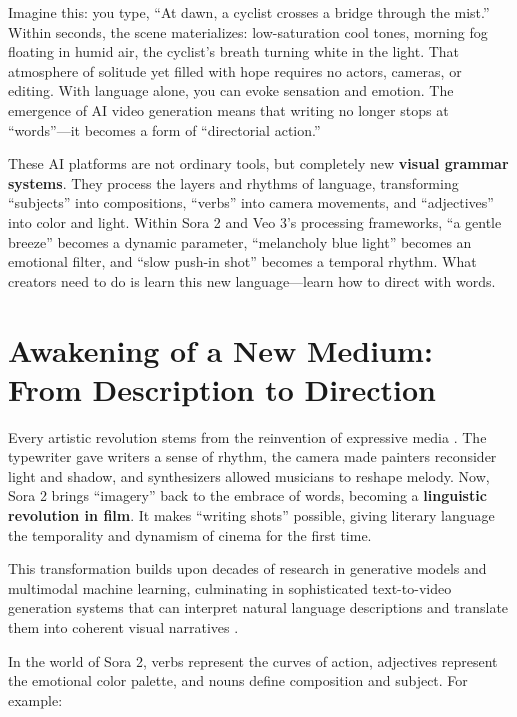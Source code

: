 Imagine this: you type, ``At dawn, a cyclist crosses a bridge through the mist.'' Within seconds, the scene materializes: low-saturation cool tones, morning fog floating in humid air, the cyclist's breath turning white in the light. That atmosphere of solitude yet filled with hope requires no actors, cameras, or editing. With language alone, you can evoke sensation and emotion. The emergence of AI video generation means that writing no longer stops at ``words''---it becomes a form of ``directorial action.''

These AI platforms are not ordinary tools, but completely new \textbf{visual grammar systems}. They process the layers and rhythms of language, transforming ``subjects'' into compositions, ``verbs'' into camera movements, and ``adjectives'' into color and light. Within Sora 2 and Veo 3's processing frameworks, ``a gentle breeze'' becomes a dynamic parameter, ``melancholy blue light'' becomes an emotional filter, and ``slow push-in shot'' becomes a temporal rhythm. What creators need to do is learn this new language---learn how to direct with words.

\section{Awakening of a New Medium: From Description to Direction}

Every artistic revolution stems from the reinvention of expressive media \citep{manovich2001language}. The typewriter gave writers a sense of rhythm, the camera made painters reconsider light and shadow, and synthesizers allowed musicians to reshape melody. Now, Sora 2 brings ``imagery'' back to the embrace of words, becoming a \textbf{linguistic revolution in film}. It makes ``writing shots'' possible, giving literary language the temporality and dynamism of cinema for the first time.

This transformation builds upon decades of research in generative models \citep{goodfellow2014generative} and multimodal machine learning, culminating in sophisticated text-to-video generation systems that can interpret natural language descriptions and translate them into coherent visual narratives \citep{singer2022make}.

In the world of Sora 2, verbs represent the curves of action, adjectives represent the emotional color palette, and nouns define composition and subject. For example:

